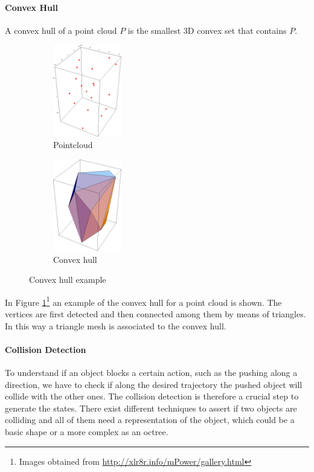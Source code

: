 \paragraph{Convex Hull}
A convex hull of a point cloud $P$ is the smallest 3D convex set that contains $P$. 
\begin{figure}[h]
\centering
\begin{subfigure}[t]{0.3\textwidth}
\centering
\includegraphics[height=4cm]{Img/convexhull/ch1.png}
\caption{Pointcloud}
\end{subfigure}
\begin{subfigure}[t]{0.3\textwidth}
\centering
\includegraphics[height=4cm]{Img/convexhull/ch3.png}
\caption{Convex hull}
\end{subfigure}
\caption{Convex hull example}\label{fig:convexhull_example}
\end{figure}
In Figure \ref{fig:convexhull_example}\footnote{Images obtained from \href{http://xlr8r.info/mPower/gallery.html}{\url{http://xlr8r.info/mPower/gallery.html}}} an example of the convex hull for a point cloud is shown. The vertices are first detected and then connected among them by means of triangles. In this way a triangle mesh is associated to the convex hull. 

\paragraph{Collision Detection}
To understand if an object blocks a certain action, such as the pushing along a direction, we have to check if along the desired trajectory the pushed object will collide with the other ones. The collision detection is therefore a crucial step to generate the states. There exist different techniques to assert if two objects are colliding and all of them need a representation of the object, which could be a basic shape or a more complex as an octree. 

